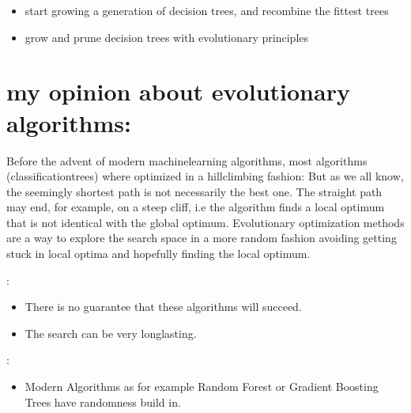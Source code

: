 \documentclass[letterpaper,10pt,english]{jupyterBook}
\begin{document}
\sphinxAtStartPar
{}
\begin{itemize}
\item {} 
\sphinxAtStartPar
start growing a generation of decision trees, and recombine the fittest trees

\item {} 
\sphinxAtStartPar
grow and prune decision trees with evolutionary principles

\end{itemize}


\section{my opinion about evolutionary algorithms:}
\label{\detokenize{Tree_Methods:my-opinion-about-evolutionary-algorithms}}
\sphinxAtStartPar
Before the advent of modern machine\sphinxhyphen{}learning algorithms, most algorithms (classification\sphinxhyphen{}trees) where optimized in a hill\sphinxhyphen{}climbing fashion: 
But as we all know, the seemingly shortest path is not necessarily the best one.
The straight path may end, for example, on a steep cliff, i.e the algorithm finds a local optimum that is not identical with the global optimum.
Evolutionary optimization methods are a way to explore the search space in a more random fashion \sphinxhyphen{} avoiding getting stuck in local optima and hopefully finding the local optimum.

\sphinxAtStartPar
{}:
\begin{itemize}
\item {} 
\sphinxAtStartPar
There is no guarantee that these algorithms will succeed.

\item {} 
\sphinxAtStartPar
The search can be very long\sphinxhyphen{}lasting.

\end{itemize}

\sphinxAtStartPar
{}:
\begin{itemize}
\item {} 
\sphinxAtStartPar
Modern Algorithms \sphinxhyphen{} as for example Random Forest or Gradient Boosting Trees \sphinxhyphen{} have randomness build in.

\end{itemize}
\end{document}

